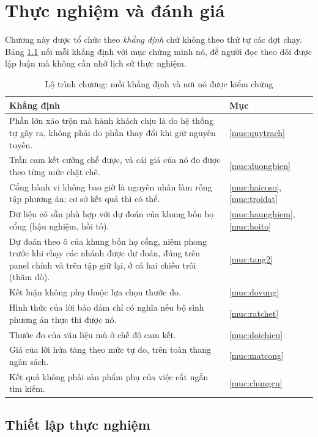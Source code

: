 \chapter{Thực nghiệm và đánh giá}

Chương này được tổ chức theo \emph{khẳng định} chứ không theo thứ tự các đợt chạy. Bảng
\ref{bang:lotrinh} nối mỗi khẳng định với mục chứng minh nó, để người đọc theo dõi được lập
luận mà không cần nhớ lịch sử thực nghiệm.

\begin{table}[htbp]
\centering
\caption{Lộ trình chương: mỗi khẳng định và nơi nó được kiểm chứng}
\label{bang:lotrinh}
\small
\begin{tabular}{@{}p{9.6cm}l@{}}
\toprule
\textbf{Khẳng định} & \textbf{Mục}\\
\midrule
Phần lớn xáo trộn mà hành khách chịu là do hệ thống tự gây ra, không phải do phần thay đổi khi
giữ nguyên tuyến. & \ref{muc:quytrach}\\
Trần cam kết cưỡng chế được, và cái giá của nó đo được theo từng mức chặt chẽ. &
\ref{muc:duongbien}\\
Cổng hành vi không bao giờ là nguyên nhân làm rỗng tập phương án; cơ sở kết quả thì có thể. &
\ref{muc:haicoso}, \ref{muc:troidat}\\
Dữ liệu có sẵn phù hợp với dự đoán của khung bốn họ cổng (hậu nghiệm, hồi tố). &
\ref{muc:haunghiem}, \ref{muc:hoito}\\
Dự đoán theo ô của khung bốn họ cổng, niêm phong trước khi chạy các nhánh được dự đoán, đúng trên
panel chính và trên tập
giữ lại, ở cả hai chiều trôi (thăm dò). & \ref{muc:tang2}\\
Kết luận không phụ thuộc lựa chọn thước đo. & \ref{muc:dovung}\\
Hình thức của lời bảo đảm chỉ có nghĩa nếu bộ sinh phương án thực thi được nó. & \ref{muc:ratchet}\\
Thước đo của văn liệu mù ở chế độ cam kết. & \ref{muc:doichieu}\\
Giá của lời hứa tăng theo mức tự do, trên toàn thang ngân sách. & \ref{muc:matcong}\\
Kết quả không phải sản phẩm phụ của việc cắt ngắn tìm kiếm. & \ref{muc:chungcu}\\
\bottomrule
\end{tabular}
\end{table}

\section{Thiết lập thực nghiệm}
\label{muc:thietlap}

